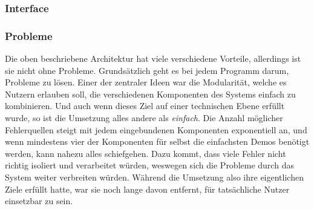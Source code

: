 \documentclass[11pt]{article}
\begin{document}
\subsubsection{Interface}
\label{sec:org3779d0a}
\subsubsection{Probleme}
\label{sec:org93c9f6e}
Die oben beschriebene Architektur hat viele verschiedene Vorteile,
allerdings ist sie nicht ohne Probleme. Grundsätzlich geht es bei
jedem Programm darum, Probleme zu lösen. Einer der zentraler Ideen war
die Modularität, welche es Nutzern erlauben soll, die verschiedenen
Komponenten des Systems einfach zu kombinieren. Und auch wenn dieses
Ziel auf einer technischen Ebene erfüllt wurde, so ist die Umsetzung
alles andere als \emph{einfach}. Die Anzahl möglicher Fehlerquellen steigt
mit jedem eingebundenen Komponenten exponentiell an, und wenn
mindestens vier der Komponenten für selbst die einfachsten Demos
benötigt werden, kann nahezu alles schiefgehen. Dazu kommt, dass viele
Fehler nicht richtig isoliert und verarbeitet würden, weswegen sich
die Probleme durch das System weiter verbreiten würden. Während die
Umsetzung also ihre eigentlichen Ziele erfüllt hatte, war sie noch
lange davon entfernt, für tatsächliche Nutzer einsetzbar zu sein.\\
\end{document}
